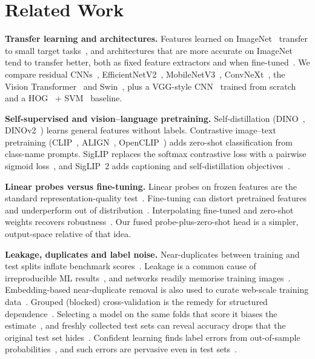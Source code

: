 \documentclass[conference]{IEEEtran}
\begin{document}
\section{Related Work}
\textbf{Transfer learning and architectures.} Features learned on ImageNet~\cite{russakovsky2015imagenet} transfer
to small target tasks~\cite{yosinski2014transferable}, and architectures that are more accurate on ImageNet tend to
transfer better, both as fixed feature extractors and when fine-tuned~\cite{kornblith2019transfer}. We compare residual
CNNs~\cite{he2016resnet,wightman2021rsb}, EfficientNetV2~\cite{tan2021efficientnetv2},
MobileNetV3~\cite{howard2019mobilenetv3}, ConvNeXt~\cite{liu2022convnext}, the Vision
Transformer~\cite{dosovitskiy2020vit,steiner2022augreg} and Swin~\cite{liu2021swin}, plus a VGG-style
CNN~\cite{simonyan2014vgg,ioffe2015bn} trained from scratch and a HOG~\cite{dalal2005hog} + SVM~\cite{cortes1995svm}
baseline.

\textbf{Self-supervised and vision--language pretraining.} Self-distillation (DINO~\cite{caron2021dino},
DINOv2~\cite{oquab2023dinov2}) learns general features without labels. Contrastive image--text pretraining
(CLIP~\cite{radford2021clip}, ALIGN~\cite{jia2021align}, OpenCLIP~\cite{cherti2023openclip}) adds zero-shot
classification from class-name prompts. SigLIP replaces the softmax contrastive loss with a pairwise sigmoid
loss~\cite{zhai2023siglip}, and SigLIP~2 adds captioning and self-distillation objectives~\cite{tschannen2025siglip2}.

\textbf{Linear probes versus fine-tuning.} Linear probes on frozen features are the standard representation-quality
test~\cite{radford2021clip,oquab2023dinov2}. Fine-tuning can distort pretrained features and underperform out of
distribution~\cite{kumar2022finetuning}. Interpolating fine-tuned and zero-shot weights recovers
robustness~\cite{wortsman2022wiseft}. Our fused probe-plus-zero-shot head is a simpler, output-space relative of
that idea.

\textbf{Leakage, duplicates and label noise.} Near-duplicates between training and test splits inflate benchmark
scores~\cite{barz2020cifair}. Leakage is a common cause of irreproducible ML results~\cite{kapoor2023leakage}, and
networks readily memorise training images~\cite{zhang2017rethinking}. Embedding-based near-duplicate removal is also used to curate
web-scale training data~\cite{abbas2023semdedup}. Grouped (blocked) cross-validation is the remedy for structured
dependence~\cite{roberts2017cv}. Selecting a model on the same folds that score it biases the
estimate~\cite{varma2006bias}, and freshly collected test sets can reveal accuracy drops that the original test set
hides~\cite{recht2019imagenet}.
Confident learning finds label errors from out-of-sample probabilities~\cite{northcutt2021confident}, and such
errors are pervasive even in test sets~\cite{northcutt2021pervasive}.
\end{document}
